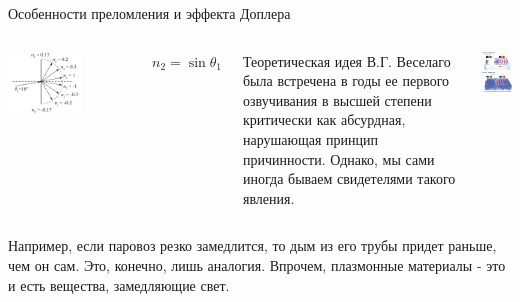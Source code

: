 \documentclass[9pt, compress, xcolor=table]{beamer}
\begin{document}
\begin{frame}{Особенности преломления и эффекта Доплера}


\begin{columns}[c]
\column{6cm}
\begin{center}
\includegraphics[width=0.6\textwidth]{neg_ref_2}
\end{center}
$n_2 = \sin \theta_1$

 Теоретическая идея В.Г. Веселаго была встречена в годы ее первого озвучивания в высшей степени критически как абсурдная, нарушающая принцип причинности. Однако, мы сами иногда бываем свидетелями такого явления. 
\column{6cm}
\begin{center}
\includegraphics[width=5cm]{neg_ref_6}
\end{center}
\end{columns}
Например, если паровоз резко замедлится, то дым из его трубы придет раньше, чем он сам. Это, конечно, лишь аналогия. Впрочем, плазмонные материалы - это и есть вещества, замедляющие свет.

\end{frame}
\end{document}
